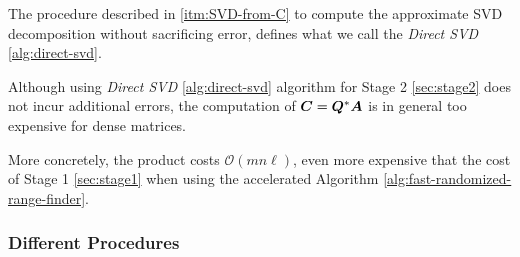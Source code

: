 The procedure described in \ref{itm:SVD-from-C} to compute the approximate 
SVD decomposition without sacrificing error, defines what we call
the \textit{Direct SVD} \ref{alg:direct-svd}.

\begin{figure}[ht]
\begin{center}
\end{center}
\end{figure}

Although using \textit{Direct SVD} \ref{alg:direct-svd} algorithm for
Stage 2 \ref{sec:stage2} does not incur additional errors, the computation
of $\bm{C}=\bm{Q}^*\bm{A}$ is in general too expensive for dense matrices.

More concretely, the product costs $\mathcal{O}(mn\ell)$, even more
expensive that the cost of Stage 1 \ref{sec:stage1} when using
the accelerated Algorithm
\ref{alg:fast-randomized-range-finder}.

\subsubsection{Different Procedures} \label{sec:dif-app}

